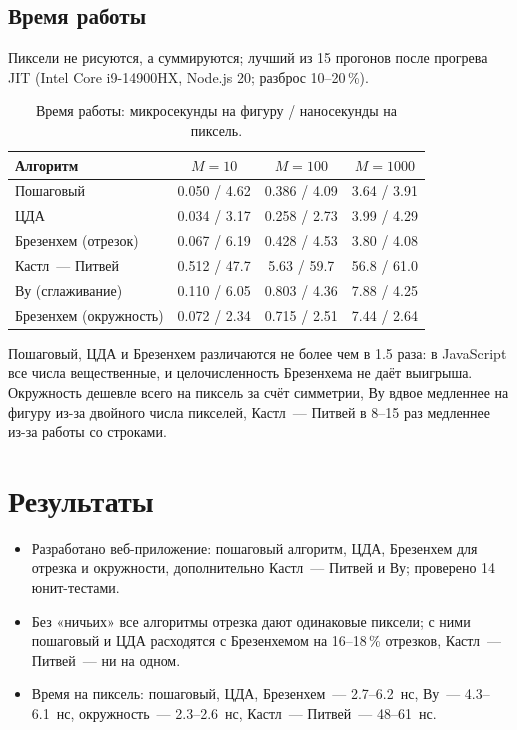 \documentclass[11pt,a4paper]{article}
\begin{document}
\subsection{Время работы}
Пиксели не рисуются, а суммируются; лучший из 15 прогонов после прогрева
JIT (Intel Core i9-14900HX, Node.js 20; разброс 10--20\,\%).

\begin{table}[H]
\centering\small
\caption{Время работы: микросекунды на фигуру / наносекунды на пиксель.}
\begin{tabular}{lccc}
\toprule
Алгоритм & $M = 10$ & $M = 100$ & $M = 1000$ \\
\midrule
Пошаговый                & 0.050 / 4.62 & 0.386 / 4.09 & 3.64 / 3.91 \\
ЦДА                      & 0.034 / 3.17 & 0.258 / 2.73 & 3.99 / 4.29 \\
Брезенхем (отрезок)      & 0.067 / 6.19 & 0.428 / 4.53 & 3.80 / 4.08 \\
Кастл~— Питвей           & 0.512 / 47.7 & 5.63 / 59.7  & 56.8 / 61.0 \\
Ву (сглаживание)         & 0.110 / 6.05 & 0.803 / 4.36 & 7.88 / 4.25 \\
Брезенхем (окружность)   & 0.072 / 2.34 & 0.715 / 2.51 & 7.44 / 2.64 \\
\bottomrule
\end{tabular}
\end{table}
Пошаговый, ЦДА и Брезенхем различаются не более чем в 1.5 раза: в JavaScript
все числа вещественные, и целочисленность Брезенхема не даёт выигрыша.
Окружность дешевле всего на пиксель за счёт симметрии, Ву вдвое медленнее на
фигуру из-за двойного числа пикселей, Кастл~— Питвей в 8--15 раз медленнее из-за
работы со строками.

\section{Результаты}
\begin{itemize}[label=--, leftmargin=1.5em, itemsep=0.2em, topsep=0.2em]
  \item Разработано веб-приложение: пошаговый алгоритм, ЦДА, Брезенхем для
        отрезка и окружности, дополнительно Кастл~— Питвей и Ву; проверено 14 юнит-тестами.
  \item Без «ничьих» все алгоритмы отрезка дают одинаковые пиксели; с ними
        пошаговый и ЦДА расходятся с Брезенхемом на 16--18\,\% отрезков,
        Кастл~— Питвей~— ни на одном.
  \item Время на пиксель: пошаговый, ЦДА, Брезенхем~— 2.7--6.2~нс, Ву~—
        4.3--6.1~нс, окружность~— 2.3--2.6~нс, Кастл~— Питвей~— 48--61~нс.
\end{itemize}
\end{document}
